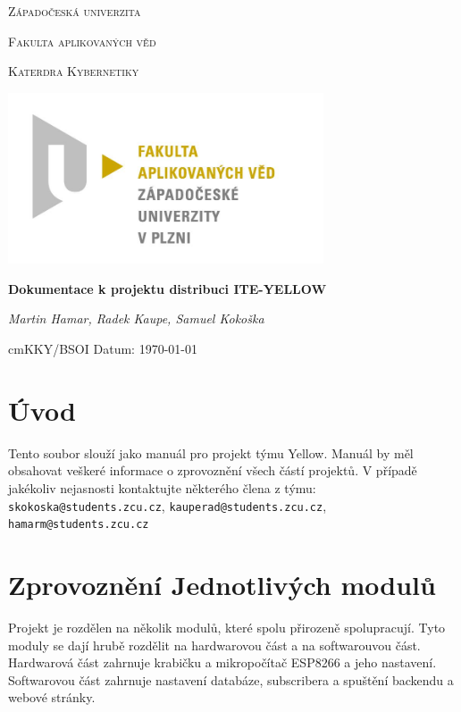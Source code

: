 \documentclass{article}
\begin{document}
\begin{titlepage}

	\centering

	{\scshape\LARGE Západočeská univerzita\par}
	{\scshape\Large Fakulta aplikovaných věd \par}
	{\scshape\Large Katerdra Kybernetiky \par}
	{\begin{center}
			\includegraphics[width=0.7\textwidth]{../pic/fav.jpg}
		\end{center}}

	{\huge\bfseries Dokumentace k projektu distribuci ITE-YELLOW\par} %

	\vspace{2cm}

	{\Large\itshape Martin Hamar, Radek Kaupe, Samuel Kokoška\par}

	\vfill

	\vspace{1cm}

	 cm{KKY/BSOI} \hfill {Datum: \today }



\end{titlepage}

\section{Úvod}
Tento soubor slouží jako manuál pro projekt týmu Yellow. Manuál by měl obsahovat veškeré informace o zprovoznění všech částí projektů. V případě jakékoliv nejasnosti kontaktujte některého člena z týmu: \texttt{skokoska@students.zcu.cz}, \texttt{kauperad@students.zcu.cz}, \texttt{hamarm@students.zcu.cz}

\section{Zprovoznění Jednotlivých modulů}
Projekt je rozdělen na několik modulů, které spolu přirozeně spolupracují. Tyto moduly se dají hrubě rozdělit na hardwarovou část a na softwarouvou část.
Hardwarová část zahrnuje krabičku a mikropočítač ESP8266 a jeho nastavení. Softwarovou část zahrnuje nastavení databáze, subscribera a spuštění backendu a webové stránky.
\end{document}
